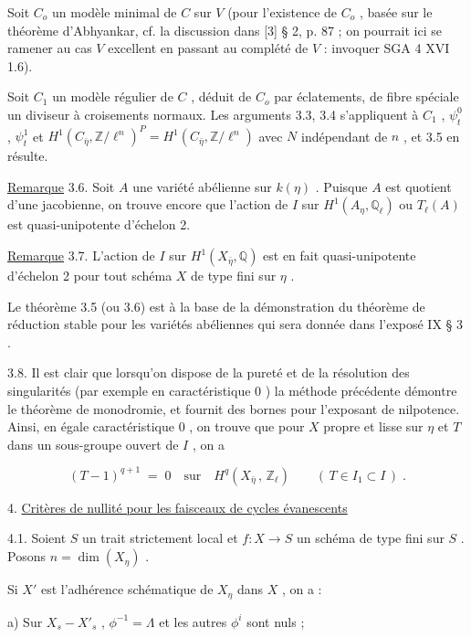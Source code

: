 Soit  $C_o$  un modèle minimal de  $C$  sur  $V$  (pour l'existence de  $C_o$ , basée sur le théorème d'Abhyankar, cf. la discussion dans  [3] § 2, p. 87 ; on pourrait ici se ramener au cas  $V$  excellent en passant au complété de  $V$ : invoquer SGA 4 XVI 1.6).

Soit  $C_1$  un modèle régulier de  $C$ , déduit de  $C_o$  par éclatements, de fibre spéciale un diviseur à croisements  normaux. Les arguments 3.3, 3.4 s'appliquent à  $C_1$ , $\psi_t^0$ , $\psi_t^1$  et  $H^1(C_{\bar\eta},\mathbb{Z}/\ell^n)^P = H^1(C_{\bar\eta},\mathbb{Z}/\ell^n)$  avec  $N$  indépendant de  $n$ , et 3.5 en résulte.

\underline{Remarque} 3.6.    Soit  $A$  une variété abélienne sur  $k(\eta)$ . Puisque  $A$  est quotient d'une jacobienne, on trouve encore que l'action de  $I$  sur  $H^1(A_\eta,\mathbb{Q}_\ell)$  ou  $T_\ell(A)$  est quasi-unipotente d'échelon 2.

\underline{Remarque} 3.7.   L'action de  $I$  sur  $H^1(X_{\bar\eta},\mathbb{Q})$  est en fait quasi-unipotente d'échelon 2 pour tout schéma  $X$  de type fini sur  $\eta$ .

Le théorème 3.5 (ou 3.6) est à la base de la démonstration du théorème de réduction stable pour les variétés abéliennes qui sera donnée dans l'exposé IX § 3 .

3.8.   Il est clair que lorsqu'on dispose de la pureté et de la résolution des singularités (par exemple en caractéristique 0 ) la méthode précédente démontre le théorème de monodromie, et fournit des bornes pour l'exposant de nilpotence. Ainsi, en égale caractéristique 0 , on trouve que pour  $X$  propre et lisse sur  $\eta$  et  $T$  dans un sous-groupe ouvert de  $I$ , on a

\begin{equation*}
(T - 1)^{q+1} \;=\; 0 \quad \text{sur} \quad H^q(X_{\bar\eta}\,,\, \mathbb{Z}_\ell) \qquad ( \, T \in I_1 \subset I \, ) \; .
\end{equation*}

4. \underline{Critères de nullité pour les faisceaux de cycles évanescents}

4.1.  Soient  $S$  un trait strictement local et  $f : X \longrightarrow S$  un schéma de type fini sur  $S$ . Posons  $n = \dim(X_\eta)$ .

Si  $X'$  est l'adhérence schématique de  $X_\eta$ dans  $X$ , on a :

a) Sur  $X_s - X'_s$ ,  $\phi^{-1} = \Lambda$  et les autres  $\phi^i$  sont nuls ;



